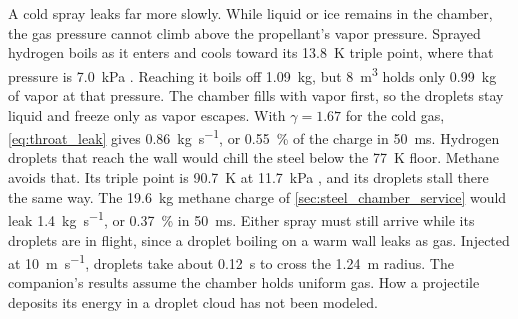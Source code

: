 \documentclass{article}
\begin{document}
A cold spray leaks far more slowly. While liquid or ice remains in the chamber, the gas pressure cannot climb above the propellant's vapor pressure. Sprayed hydrogen boils as it enters and cools toward its \SI{13.8}{\kelvin} triple point, where that pressure is \SI{7.0}{\kilo\pascal} \cite{nist_webbook_hydrogen}. Reaching it boils off \SI{1.09}{\kilogram}, but \SI{8}{\cubic\meter} holds only \SI{0.99}{\kilogram} of vapor at that pressure. The chamber fills with vapor first, so the droplets stay liquid and freeze only as vapor escapes. With $\gamma=1.67$ for the cold gas, \autoref{eq:throat_leak} gives \SI{0.86}{\kilogram\per\second}, or \SI{0.55}{\percent} of the charge in \SI{50}{\milli\second}. Hydrogen droplets that reach the wall would chill the steel below the \SI{77}{\kelvin} floor. Methane avoids that. Its triple point is \SI{90.7}{\kelvin} at \SI{11.7}{\kilo\pascal} \cite{nist_webbook_methane}, and its droplets stall there the same way. The \SI{19.6}{\kilogram} methane charge of \autoref{sec:steel_chamber_service} would leak \SI{1.4}{\kilogram\per\second}, or \SI{0.37}{\percent} in \SI{50}{\milli\second}. Either spray must still arrive while its droplets are in flight, since a droplet boiling on a warm wall leaks as gas. Injected at \SI{10}{\meter\per\second}, droplets take about \SI{0.12}{\second} to cross the \SI{1.24}{\meter} radius. The companion's results assume the chamber holds uniform gas. How a projectile deposits its energy in a droplet cloud has not been modeled.
\end{document}
